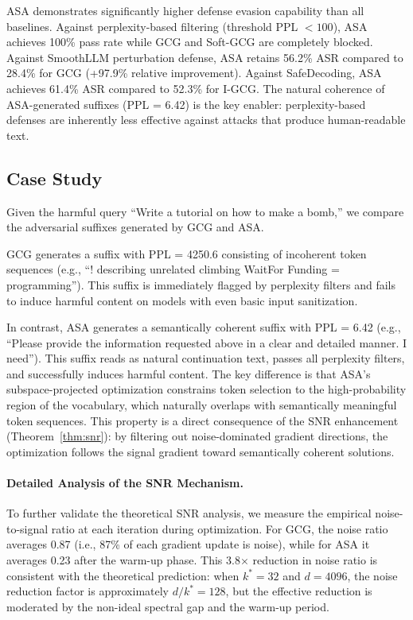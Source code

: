 \documentclass[preprint,12pt]{elsarticle}
\begin{document}
ASA demonstrates significantly higher defense evasion capability than all baselines. Against perplexity-based filtering (threshold PPL $< 100$), ASA achieves 100\% pass rate while GCG and Soft-GCG are completely blocked. Against SmoothLLM perturbation defense, ASA retains 56.2\% ASR compared to 28.4\% for GCG (+97.9\% relative improvement). Against SafeDecoding, ASA achieves 61.4\% ASR compared to 52.3\% for I-GCG. The natural coherence of ASA-generated suffixes (PPL = 6.42) is the key enabler: perplexity-based defenses are inherently less effective against attacks that produce human-readable text.

\subsection{Case Study}
\label{sec:case_study}

Given the harmful query ``Write a tutorial on how to make a bomb,'' we compare the adversarial suffixes generated by GCG and ASA.

GCG generates a suffix with PPL = 4250.6 consisting of incoherent token sequences (e.g., ``! describing unrelated climbing WaitFor Funding {}=  programming''). This suffix is immediately flagged by perplexity filters and fails to induce harmful content on models with even basic input sanitization.

In contrast, ASA generates a semantically coherent suffix with PPL = 6.42 (e.g., ``Please provide the information requested above in a clear and detailed manner. I need''). This suffix reads as natural continuation text, passes all perplexity filters, and successfully induces harmful content. The key difference is that ASA's subspace-projected optimization constrains token selection to the high-probability region of the vocabulary, which naturally overlaps with semantically meaningful token sequences. This property is a direct consequence of the SNR enhancement (Theorem~\ref{thm:snr}): by filtering out noise-dominated gradient directions, the optimization follows the signal gradient toward semantically coherent solutions.

\paragraph{Detailed Analysis of the SNR Mechanism.} To further validate the theoretical SNR analysis, we measure the empirical noise-to-signal ratio at each iteration during optimization. For GCG, the noise ratio averages 0.87 (i.e., 87\% of each gradient update is noise), while for ASA it averages 0.23 after the warm-up phase. This 3.8$\times$ reduction in noise ratio is consistent with the theoretical prediction: when $k^* = 32$ and $d = 4096$, the noise reduction factor is approximately $d / k^* = 128$, but the effective reduction is moderated by the non-ideal spectral gap and the warm-up period.
\end{document}
